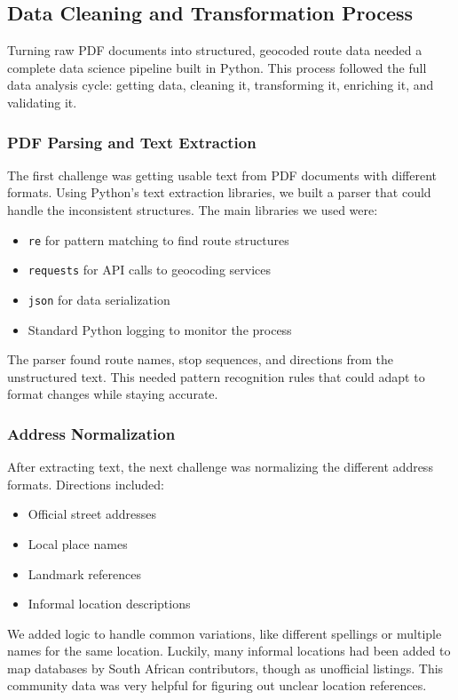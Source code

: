 \documentclass[a4paper,12pt]{article}
\begin{document}
\subsection{Data Cleaning and Transformation Process}
Turning raw PDF documents into structured, geocoded route data needed a complete data science pipeline built in Python. This process followed the full data analysis cycle: getting data, cleaning it, transforming it, enriching it, and validating it.

\subsubsection{PDF Parsing and Text Extraction}
The first challenge was getting usable text from PDF documents with different formats. Using Python's text extraction libraries, we built a parser that could handle the inconsistent structures. The main libraries we used were:

\begin{itemize}
\item \texttt{re} for pattern matching to find route structures
\item \texttt{requests} for API calls to geocoding services
\item \texttt{json} for data serialization
\item Standard Python logging to monitor the process
\end{itemize}

The parser found route names, stop sequences, and directions from the unstructured text. This needed pattern recognition rules that could adapt to format changes while staying accurate.

\subsubsection{Address Normalization}
After extracting text, the next challenge was normalizing the different address formats. Directions included:
\begin{itemize}
\item Official street addresses
\item Local place names
\item Landmark references
\item Informal location descriptions
\end{itemize}

We added logic to handle common variations, like different spellings or multiple names for the same location. Luckily, many informal locations had been added to map databases by South African contributors, though as unofficial listings. This community data was very helpful for figuring out unclear location references.
\end{document}
